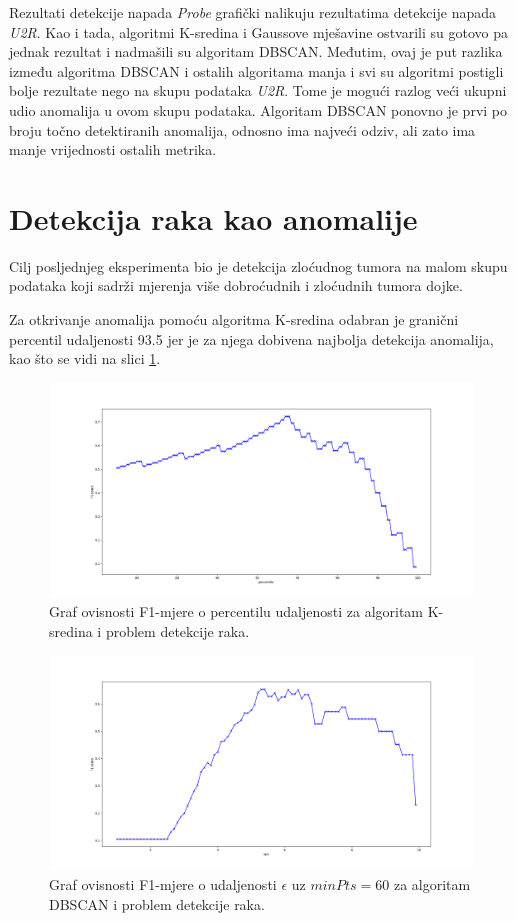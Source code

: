 \documentclass[utf8, diplomski, numeric]{fer}
\begin{document}
Rezultati detekcije napada \textit{Probe} grafički nalikuju rezultatima detekcije napada \textit{U2R}. Kao i tada, algoritmi K-sredina i Gaussove mješavine ostvarili su gotovo pa jednak rezultat i nadmašili su algoritam DBSCAN. Međutim, ovaj je put razlika između algoritma DBSCAN i ostalih algoritama manja i svi su algoritmi postigli bolje rezultate nego na skupu podataka \textit{U2R}. Tome je mogući razlog veći ukupni udio anomalija u ovom skupu podataka. Algoritam DBSCAN ponovno je prvi po broju točno detektiranih anomalija, odnosno ima najveći odziv, ali zato ima manje vrijednosti ostalih metrika.

\section{Detekcija raka kao anomalije}
Cilj posljednjeg eksperimenta bio je detekcija zloćudnog tumora na malom skupu podataka koji sadrži mjerenja više dobroćudnih i zloćudnih tumora dojke.

Za otkrivanje anomalija pomoću algoritma K-sredina odabran je granični percentil udaljenosti 93.5 jer je za njega dobivena najbolja detekcija anomalija, kao što se vidi na slici \ref{fig:cancer-kmeans}.

\begin{figure}[h!]
\includegraphics[width=1\textwidth]{images/cancer-kmeans-f1.png}
\centering
\caption{Graf ovisnosti F1-mjere o percentilu udaljenosti za algoritam K-sredina i problem detekcije raka.}
\label{fig:cancer-kmeans}
\end{figure}

\begin{figure}[h!]
\includegraphics[width=1\textwidth]{images/cancer-dbscan-f1eps.png}
\centering
\caption{Graf ovisnosti F1-mjere o udaljenosti $\epsilon$ uz $minPts=60$ za algoritam DBSCAN i problem detekcije raka.}
\label{fig:cancer-dbscan1}
\end{figure}
\end{document}
